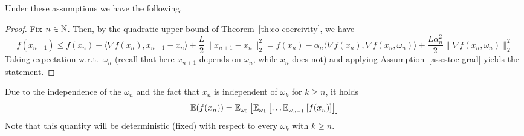  
     Under these assumptions we have the following.
 
 
     \begin{proof}
         Fix $n\in\mathbb{N}$.
         Then, by the quadratic upper bound of Theorem~\ref{th:co-coercivity}, we have
         \begin{equation}
             \label{eq:first-step}
             f(x_{n+1})
             \le f(x_n) + \langle \nabla f(x_n), x_{n+1}-x_n \rangle+\frac{L}2\|x_{n+1}-x_n\|_2^2
             =  f(x_n) -\alpha_n \langle \nabla f(x_n), \nabla f(x_n,\omega_n) \rangle +\frac{L\alpha_n^2}2\|\nabla f(x_{n},\omega_n)\|_2^2
         \end{equation}
         Taking expectation w.r.t.~$\omega_n$ (recall that here $x_{n+1}$ depends on $\omega_n$, while $x_n$ does not) and applying Assumption~\ref{ass:stoc-grad} yields the statement.
     \end{proof}
 
     \begin{remark}
         Due to the independence of the $\omega_n$ and the fact that $x_n$ is independent of $\omega_k$ for $k\ge n$, it holds
         \begin{equation}
             \mathbb{E}(f(x_n)) = \mathbb{E}_{\omega_0} \left[ \mathbb{E}_{\omega_1} \left[ \ldots \mathbb{E}_{\omega_{n-1}}\left[ f(x_n) \right]\right] \right]
         \end{equation}
         Note that this quantity will be deterministic (fixed) with respect to every $\omega_k$ with $k\ge n$.
     \end{remark}
 
